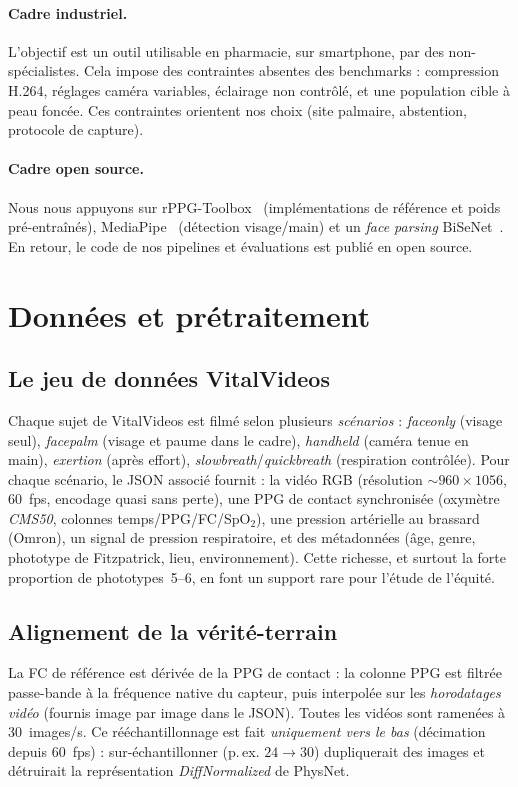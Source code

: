 \documentclass[11pt]{article}
\begin{document}
\paragraph{Cadre industriel.} L'objectif est un outil utilisable en pharmacie, sur
smartphone, par des non-spécialistes. Cela impose des contraintes absentes des
benchmarks : compression H.264, réglages caméra variables, éclairage non contrôlé,
et une population cible à peau foncée. Ces contraintes orientent nos choix (site
palmaire, abstention, protocole de capture).

\paragraph{Cadre open source.} Nous nous appuyons sur rPPG-Toolbox~\cite{liu2023}
(implémentations de référence et poids pré-entraînés), MediaPipe~\cite{lugaresi2019}
(détection visage/main) et un \emph{face parsing} BiSeNet~\cite{yu2018bisenet}. En
retour, le code de nos pipelines et évaluations est publié en open source.

\section{Données et prétraitement}
\label{sec:donnees}

\subsection{Le jeu de données VitalVideos}
Chaque sujet de VitalVideos est filmé selon plusieurs \emph{scénarios} :
\emph{faceonly} (visage seul), \emph{facepalm} (visage et paume dans le cadre),
\emph{handheld} (caméra tenue en main), \emph{exertion} (après effort),
\emph{slowbreath}/\emph{quickbreath} (respiration contrôlée). Pour chaque scénario, le
JSON associé fournit : la vidéo RGB (résolution $\sim$$960\times1056$, 60~fps,
encodage quasi sans perte), une PPG de contact synchronisée (oxymètre \emph{CMS50},
colonnes temps/PPG/FC/SpO$_2$), une pression artérielle au brassard (Omron), un
signal de pression respiratoire, et des métadonnées (âge, genre, phototype de
Fitzpatrick, lieu, environnement). Cette richesse, et surtout la forte proportion de
phototypes~5--6, en font un support rare pour l'étude de l'équité.

\subsection{Alignement de la vérité-terrain}
La FC de référence est dérivée de la PPG de contact : la colonne PPG est filtrée
passe-bande à la fréquence native du capteur, puis interpolée sur les
\emph{horodatages vidéo} (fournis image par image dans le JSON). Toutes les vidéos
sont ramenées à 30~images/s. Ce rééchantillonnage est fait \emph{uniquement vers le
bas} (décimation depuis 60~fps) : sur-échantillonner (p.\,ex. $24\to30$) dupliquerait
des images et détruirait la représentation \emph{DiffNormalized} de PhysNet.
\end{document}
